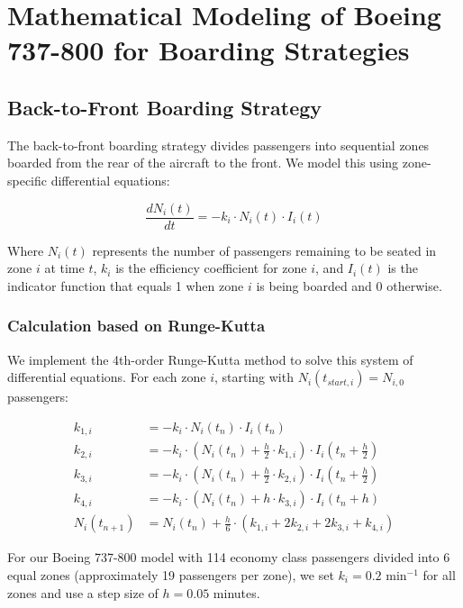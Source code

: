
\section{Mathematical Modeling of Boeing 737-800 for Boarding Strategies}

\subsection{Back-to-Front Boarding Strategy}

The back-to-front boarding strategy divides passengers into sequential zones boarded from the rear of the aircraft to the front. We model this using zone-specific differential equations:

\begin{equation}
\frac{dN_i(t)}{dt} = -k_i \cdot N_i(t) \cdot I_i(t)
\end{equation}

Where $N_i(t)$ represents the number of passengers remaining to be seated in zone $i$ at time $t$, $k_i$ is the efficiency coefficient for zone $i$, and $I_i(t)$ is the indicator function that equals 1 when zone $i$ is being boarded and 0 otherwise.

\subsubsection{Calculation based on Runge-Kutta}

We implement the 4th-order Runge-Kutta method to solve this system of differential equations. For each zone $i$, starting with $N_i(t_{start,i}) = N_{i,0}$ passengers:

\begin{align}
k_{1,i} &= -k_i \cdot N_i(t_n) \cdot I_i(t_n) \\
k_{2,i} &= -k_i \cdot (N_i(t_n) + \frac{h}{2} \cdot k_{1,i}) \cdot I_i(t_n + \frac{h}{2}) \\
k_{3,i} &= -k_i \cdot (N_i(t_n) + \frac{h}{2} \cdot k_{2,i}) \cdot I_i(t_n + \frac{h}{2}) \\
k_{4,i} &= -k_i \cdot (N_i(t_n) + h \cdot k_{3,i}) \cdot I_i(t_n + h) \\
N_i(t_{n+1}) &= N_i(t_n) + \frac{h}{6} \cdot (k_{1,i} + 2k_{2,i} + 2k_{3,i} + k_{4,i})
\end{align}

For our Boeing 737-800 model with 114 economy class passengers divided into 6 equal zones (approximately 19 passengers per zone), we set $k_i = 0.2$ min$^{-1}$ for all zones and use a step size of $h = 0.05$ minutes.


